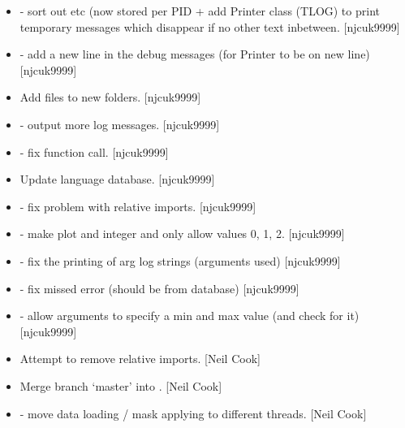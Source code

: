 \documentclass[a4paper,10pt,english]{report}
\begin{document}
\begin{itemize}
\item {} 
 - sort out  etc (now stored per PID + add
Printer class (TLOG) to print temporary messages which disappear if no
other text inbetween. {[}njcuk9999{]}

\item {} 
 - add a new line in the debug messages (for Printer to
be on new line) {[}njcuk9999{]}

\item {} 
Add  files to new folders. {[}njcuk9999{]}

\item {} 
 - output more log messages. {[}njcuk9999{]}

\item {} 
 - fix function call. {[}njcuk9999{]}

\item {} 
Update language database. {[}njcuk9999{]}

\item {} 
 - fix problem with relative imports.
{[}njcuk9999{]}

\item {} 
 - make plot and integer and only allow values 0,
1, 2. {[}njcuk9999{]}

\item {} 
 - fix the printing of arg log strings (arguments used)
{[}njcuk9999{]}

\item {} 
 - fix missed error (should be from database) {[}njcuk9999{]}

\item {} 
 - allow arguments to specify a min and max value (and
check for it) {[}njcuk9999{]}

\item {} 
Attempt to remove relative imports. {[}Neil Cook{]}

\item {} 
Merge branch ‘master’ into . {[}Neil Cook{]}

\item {} 
 - move data loading / mask applying to different
threads. {[}Neil Cook{]}


\end{itemize}
\end{document}
